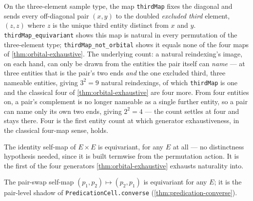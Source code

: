 \begin{proposition}\label{prop:orbital-three-counterexample}\leanok{}
On the three-element sample type, the map \texttt{thirdMap} fixes the
diagonal and sends every off-diagonal pair \((x,y)\) to the doubled
\emph{excluded third} element, \((z,z)\) where \(z\) is the unique third
entity distinct from \(x\) and \(y\). \texttt{thirdMap\_equivariant} shows
this map is natural in every permutation of the three-element type;
\texttt{thirdMap\_not\_orbital} shows it equals none of the four maps of
\cref{thm:orbital-exhaustive}. The underlying count: a natural reindexing's
image, on each hand, can only be drawn from the entities the pair itself can
\emph{name} --- at three entities that is the pair's two ends \emph{and} the
one excluded third, three nameable entities, giving \(3^2 = 9\) natural
reindexings, of which \texttt{thirdMap} is one and the classical four of
\cref{thm:orbital-exhaustive} are four more. From four entities on, a pair's
complement is no longer nameable as a single further entity, so a pair can
name only its own two ends, giving \(2^2 = 4\) --- the count settles at four
and stays there. Four is the first entity count at which generator
exhaustiveness, in the classical four-map sense, holds.
\end{proposition}

\begin{proposition}\label{prop:orbital-id-equivariant}\leanok{}
The identity self-map of \(E \times E\) is equivariant, for any \(E\) at
all --- no distinctness hypothesis needed, since it is built termwise from
the permutation action. It is the first of the four generators
\cref{thm:orbital-exhaustive} exhausts naturality into.
\end{proposition}

\begin{proposition}\label{prop:orbital-converse-equivariant}\leanok{}
The pair-swap self-map \((p_1,p_2) \mapsto (p_2,p_1)\) is equivariant for any
\(E\); it is the pair-level shadow of \texttt{PredicationCell.converse}
(\cref{thm:predication-converse}).
\end{proposition}

